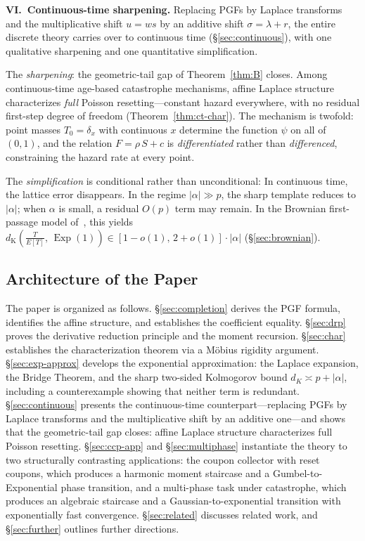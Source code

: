 \documentclass[11pt]{article}
\theoremstyle{plain}
\theoremstyle{definition}
\theoremstyle{remark}
\DeclareMathOperator{\Exp}{Exp}
\newcommand{\dK}{d_{\mathrm{K}}}
\begin{document}
\medskip
\noindent\textbf{VI.\ Continuous-time sharpening.}
Replacing PGFs by Laplace transforms and the multiplicative shift $u = ws$ by an additive shift $\sigma = \lambda + r$, the entire discrete theory carries over to continuous time (\S\ref{sec:continuous}), with one qualitative sharpening and one quantitative simplification.

The \emph{sharpening}: the geometric-tail gap of Theorem~\ref{thm:B} closes.  Among continuous-time age-based catastrophe mechanisms, affine Laplace structure characterizes \emph{full} Poisson resetting---constant hazard everywhere, with no residual first-step degree of freedom (Theorem~\ref{thm:ct-char}).  The mechanism is twofold: point masses $T_0 = \delta_x$ with continuous $x$ determine the function $\psi$ on all of $(0,1)$, and the relation $F = \rho\,S + c$ is \emph{differentiated} rather than \emph{differenced}, constraining the hazard rate at every point.

The \emph{simplification} is conditional rather than unconditional: In continuous time, the lattice error disappears. In the regime $|\alpha|\gg p$, the sharp template reduces to $|\alpha|$; when $\alpha$ is small, a residual $O(p)$ term may remain. In the Brownian first-passage model of~\cite{EM11}, this yields $\dK\!\left(\frac{T}{E[T]},\,\Exp(1)\right)\in [1-o(1),\,2+o(1)]\cdot |\alpha|$ (\S\ref{sec:brownian}).




\subsection{Architecture of the Paper}


The paper is organized as follows.  \S\ref{sec:completion} derives the PGF formula, identifies the affine structure, and establishes the coefficient equality. \S\ref{sec:drp} proves the derivative reduction principle and the moment recursion.  \S\ref{sec:char} establishes the characterization theorem via a M\"obius rigidity argument.  \S\ref{sec:exp-approx} develops the exponential approximation: the Laplace expansion, the Bridge Theorem, and the sharp two-sided Kolmogorov bound $d_K \asymp p + |\alpha|$, including a counterexample showing that neither term is redundant.  \S\ref{sec:continuous} presents the continuous-time counterpart---replacing PGFs by Laplace transforms and the multiplicative shift by an additive one---and shows that the geometric-tail gap closes: affine Laplace structure characterizes full Poisson resetting.  \S\ref{sec:ccp-app} and \S\ref{sec:multiphase} instantiate the theory to two structurally contrasting applications: the coupon collector with reset coupons, which produces a harmonic moment staircase and a Gumbel-to-Exponential phase transition, and a multi-phase task under catastrophe, which produces an algebraic staircase and a Gaussian-to-exponential transition with exponentially fast convergence.  \S\ref{sec:related} discusses related work, and \S\ref{sec:further} outlines further directions.
\end{document}
